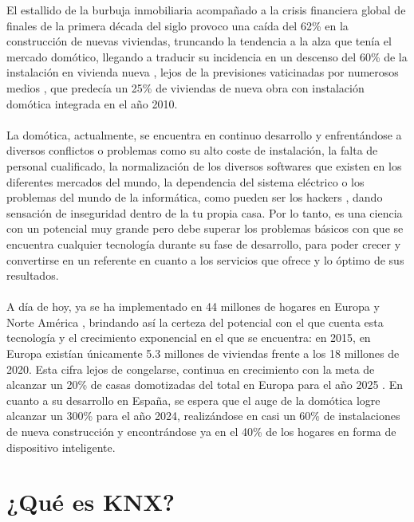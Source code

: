 El estallido de la burbuja inmobiliaria acompañado a la crisis financiera global de finales de la primera década del siglo provoco una caída del 62\% en la construcción de nuevas viviendas, truncando la tendencia a la alza que tenía el mercado domótico, llegando a traducir su incidencia en un descenso del 60\% de la instalación en vivienda nueva \cite{AED:2011}, lejos de la previsiones vaticinadas por numerosos medios \cite{mundo:2010} \cite{Info:2008}, que predecía un 25\% de viviendas de nueva obra con instalación domótica integrada en el año 2010.\\\\
 La domótica, actualmente, se encuentra en continuo desarrollo y enfrentándose a diversos conflictos o problemas como su alto coste de instalación, la falta de personal cualificado, la normalización de los diversos softwares que existen en los diferentes mercados del mundo, la dependencia del sistema eléctrico o los problemas del mundo de la informática, como pueden ser los hackers \cite{cerda:2018}, dando sensación de inseguridad dentro de la tu propia casa. Por lo tanto, es una ciencia con un potencial muy grande pero debe superar los problemas básicos con que se encuentra cualquier tecnología durante su fase de desarrollo, para poder crecer y convertirse en un referente en cuanto a los servicios que ofrece y lo óptimo de sus resultados.\\\\
A día de hoy, ya se ha implementado en 44 millones de hogares en Europa y Norte América \cite{HT:2014}, brindando así la certeza del potencial con el que cuenta esta tecnología y el crecimiento exponencial en el que se encuentra: en 2015, en Europa existían únicamente 5.3 millones de viviendas frente a los 18 millones de 2020. Esta cifra lejos de congelarse, continua en crecimiento con la meta de alcanzar un 20\% de casas domotizadas del total en Europa para el año 2025 \cite{Berg:2020}. En cuanto a su desarrollo en España, se espera que el auge de la domótica logre alcanzar un 300\% para el año 2024, realizándose en casi un 60\% de instalaciones de nueva construcción \cite{Portal:2020} y encontrándose ya en el 40\% de los hogares en forma de dispositivo inteligente.

\newpage
\section{¿Qué es KNX?}

